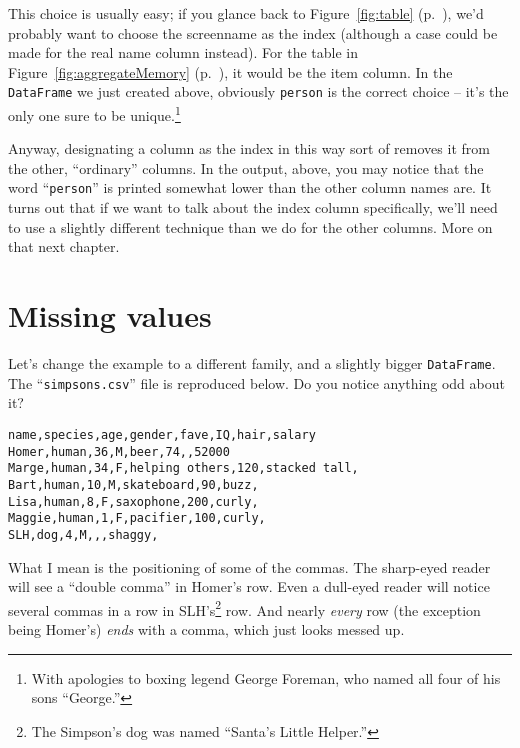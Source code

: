 
This choice is usually easy; if you glance back to Figure~\ref{fig:table}
(p.~\pageref{fig:table}), we'd probably want to choose the \textsf{screenname}
as the index (although a case could be made for the \textsf{real name} column
instead). For the table in Figure~\ref{fig:aggregateMemory}
(p.~\pageref{fig:aggregateMemory}), it would be the \textsf{item} column. In
the \texttt{DataFrame} we just created above, obviously \texttt{person} is the
correct choice -- it's the only one sure to be unique.\footnote{With apologies
to boxing legend George Foreman, who named all four of his sons ``George.''}

Anyway, designating a column as the index in this way sort of removes it from
the other, ``ordinary'' columns. In the output, above, you may notice that the
word ``\texttt{person}'' is printed somewhat lower than the other column names
are. It turns out that if we want to talk about the index column specifically,
we'll need to use a slightly different technique than we do for the other
columns. More on that next chapter.

\section{Missing values}

Let's change the example to a different family, and a slightly bigger
\texttt{DataFrame}. The ``\texttt{simpsons.csv}'' file is reproduced below. Do
you notice anything odd about it?


\vspace{-.15in}
\begin{Verbatim}[fontsize=\small,samepage=true,frame=lines,framesep=3mm]
name,species,age,gender,fave,IQ,hair,salary
Homer,human,36,M,beer,74,,52000
Marge,human,34,F,helping others,120,stacked tall,
Bart,human,10,M,skateboard,90,buzz,
Lisa,human,8,F,saxophone,200,curly,
Maggie,human,1,F,pacifier,100,curly,
SLH,dog,4,M,,,shaggy,
\end{Verbatim}
\vspace{-.15in}


What I mean is the positioning of some of the commas. The sharp-eyed reader
will see a ``double comma'' in Homer's row. Even a dull-eyed reader will notice
several commas in a row in SLH's\footnote{The Simpson's dog was named ``Santa's
Little Helper.''} row. And nearly \textit{every} row (the exception being
Homer's) \textit{ends} with a comma, which just looks messed up.

